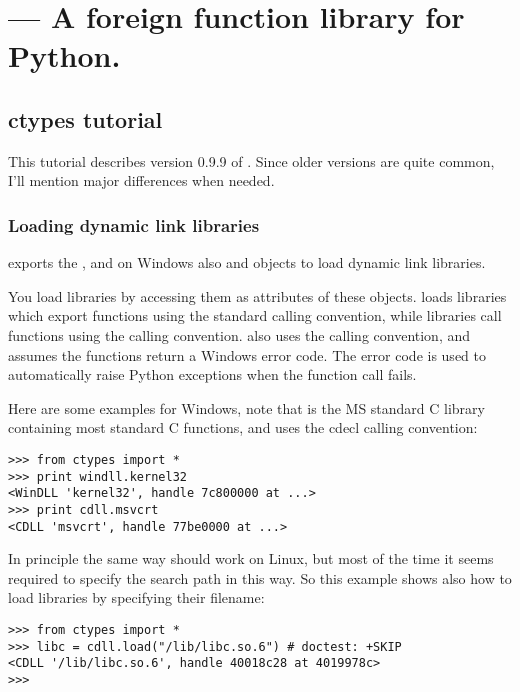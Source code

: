 \ifx\locallinewidth\undefined\newlength{\locallinewidth}\fi
\setlength{\locallinewidth}{\linewidth}
\section{ --- A foreign function library for Python.}


\subsection{ctypes tutorial\label{ctypes-ctypes-tutorial}}

This tutorial describes version 0.9.9 of .
Since older versions are quite common, I'll mention major differences
when needed.


\subsubsection{Loading dynamic link libraries\label{ctypes-loading-dynamic-link-libraries}}

 exports the , and on Windows also  and
 objects to load dynamic link libraries.

You load libraries by accessing them as attributes of these objects.
 loads libraries which export functions using the standard
 calling convention, while  libraries call
functions using the  calling convention.  also
uses the  calling convention, and assumes the functions
return a Windows  error code. The error code is used to
automatically raise  Python exceptions when the
function call fails.

Here are some examples for Windows, note that  is the MS
standard C library containing most standard C functions, and uses the
cdecl calling convention:
\begin{verbatim}
>>> from ctypes import *
>>> print windll.kernel32
<WinDLL 'kernel32', handle 7c800000 at ...>
>>> print cdll.msvcrt
<CDLL 'msvcrt', handle 77be0000 at ...>
\end{verbatim}

In principle the same way should work on Linux, but most of the time
it seems required to specify the search path in this way. So this
example shows also how to load libraries by specifying their
filename:
\begin{verbatim}
>>> from ctypes import *
>>> libc = cdll.load("/lib/libc.so.6") # doctest: +SKIP
<CDLL '/lib/libc.so.6', handle 40018c28 at 4019978c>
>>>
\end{verbatim}

